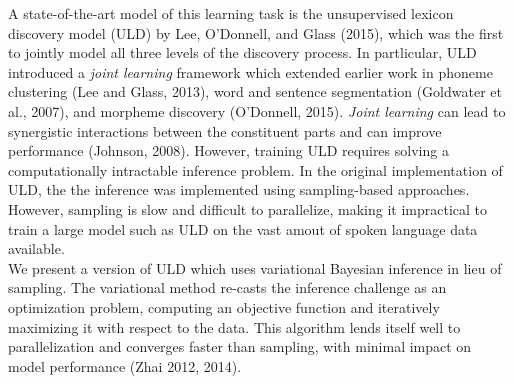 \documentclass[12pt,letterpaper]{article}
\newif\ifcomments
\newcommand{\cm}[1]{\textcolor{purple}{\ifcomments[COMMENT: #1]\else\fi}}
\begin{document}
A state-of-the-art model of this learning task is the unsupervised lexicon discovery model (ULD) by Lee, O'Donnell, and Glass (2015), which was the first to jointly model all three levels of the discovery process. In partlicular, ULD introduced a \textit{joint learning} framework which extended earlier work in phoneme clustering  (Lee and Glass, 2013), word and sentence segmentation (Goldwater et al., 2007), and morpheme discovery (O'Donnell, 2015). 
\textit{Joint learning} can lead to synergistic interactions between the constituent parts and can improve performance (Johnson, 2008). However, training ULD requires solving a computationally intractable inference problem.
In the original implementation of ULD, the the inference was implemented using sampling-based approaches.
However, sampling is slow and difficult to parallelize, making it impractical to train a large model such as ULD on the vast amout of spoken language data available. \\

We present a version of ULD which uses variational Bayesian inference in lieu of sampling. The variational method re-casts the inference challenge as an optimization problem, computing an objective function and iteratively maximizing it with respect to the data. This algorithm lends itself well to parallelization and converges faster than sampling, with minimal impact on model performance (Zhai 2012, 2014). \\
\end{document}
